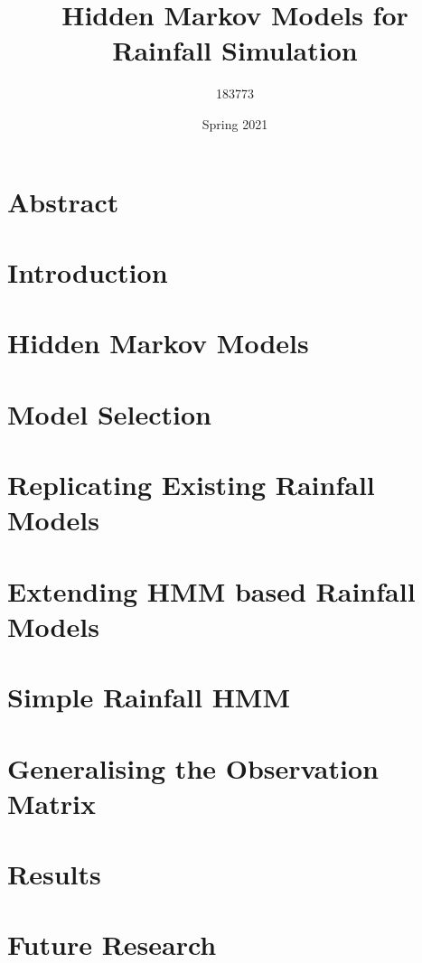 \documentclass[a4paper,12pt]{report}
\title{\Huge Hidden Markov Models for Rainfall Simulation}
\author{183773}
\date{Spring 2021}
\theoremstyle{plain}
\begin{document}
    \maketitle

    \chapter*{Abstract}
    \label{Abstract}
    

	\tableofcontents

	\newpage

	\chapter{Introduction}
    \label{Introduction}
	
	\newpage

	\chapter{Hidden Markov Models}
	\label{Hidden_Markov}
	
	\newpage

	\chapter{Model Selection}
    \label{Model_Selection}
	
	\newpage

	\chapter{Replicating Existing Rainfall Models}
	\label{Replicating_Existing_Rainfall_Model}
    
	\newpage

	\chapter{Extending HMM based Rainfall Models}
	\label{Extending_HMM_Based_Rainfall_Models}
    
	\newpage

	\chapter{Simple Rainfall HMM}
	\label{Simple_Rainfall_HMM}
    
	\newpage

	\chapter{Generalising the Observation Matrix}
	\label{Generalising_the_Observation_Matrix}
    
	\newpage

	\chapter{Results}
    \label{Results}
	
	\newpage

	\chapter{Future Research}
	\label{Future_Research}
    
	\newpage

	\nocite{*}
	\printbibliography
\end{document}
